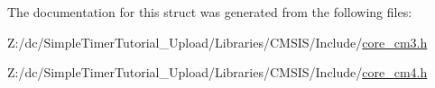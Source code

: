 The documentation for this struct was generated from the following files\-:\begin{DoxyCompactItemize}
\item 
Z\-:/dc/\-Simple\-Timer\-Tutorial\-\_\-\-Upload/\-Libraries/\-C\-M\-S\-I\-S/\-Include/\hyperlink{core__cm3_8h}{core\-\_\-cm3.\-h}\item 
Z\-:/dc/\-Simple\-Timer\-Tutorial\-\_\-\-Upload/\-Libraries/\-C\-M\-S\-I\-S/\-Include/\hyperlink{core__cm4_8h}{core\-\_\-cm4.\-h}\end{DoxyCompactItemize}
